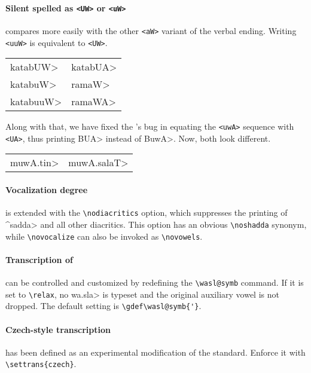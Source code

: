 \documentclass[10pt,a4paper]{article}
\newcommand{\exts}[1]{\lstinline|<#1>|}
\newcommand{\orth}[1]{{\showfalse\arabtrue\transfalse\<#1>}}
\newcommand{\phon}[1]{{\showfalse\arabfalse\transtrue\<#1>\/}}
\begin{document}
\paragraph{Silent \protect\phon{'alif} spelled as \protect\exts{UW}
           or \protect\exts{uW}}
compares more easily with the other \linebreak \exts{aW} variant of
the verbal ending. Writing \exts{uuW} is equivalent to \exts{UW}.

\medskip

\begin{tabular}{p{.5\linewidth}l}
\<katabUW>      &   \<katabUA>  \\
\<katabuW>      &   \<ramaW>    \\
\<katabuuW>     &   \<ramaWA>   \\
\end{tabular}

\bigskip

Along with that, we have fixed the \ArabTeX's bug in equating the
\exts{uwA} sequence with \exts{UA}, thus printing \orth{BUA} instead
of \orth{BuwA}. Now, both look different.

\medskip

\begin{tabular}{p{.5\linewidth}l}
\<muwA.tin>     &   \<muwA.salaT>   \\
\end{tabular}

\paragraph{Vocalization degree}
is extended with the \lstinline|\nodiacritics| option, which suppresses the
printing of \phon{^sadda} and all other diacritics. This option has an
obvious \lstinline|\noshadda| synonym, while \lstinline|\novocalize| can also be
invoked as \lstinline|\novowels|.

\paragraph{Transcription of \protect\phon{wa.sla}}
can be controlled and customized by redefining the \lstinline|\wasl@symb|
command. If it is set to \lstinline|\relax|, no \phon{wa.sla} is typeset
and the original auxiliary vowel is not dropped. The default setting
is \lstinline|\gdef\wasl@symb{'}|.

\paragraph{Czech-style transcription}
has been defined as an experimental modification of the
standard. Enforce it with \lstinline|\settrans{czech}|.
\end{document}
